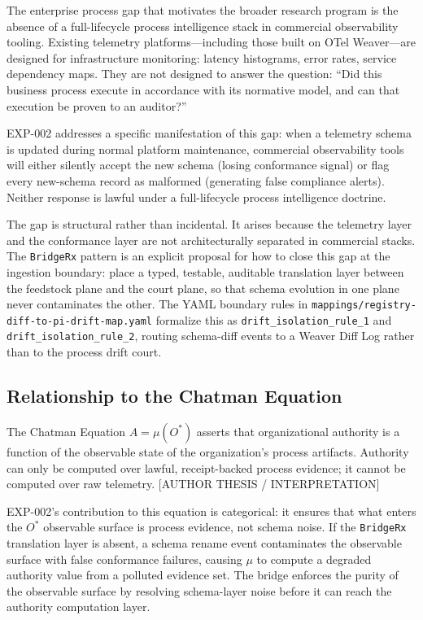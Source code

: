 The enterprise process gap that motivates the broader research program is the absence
of a full-lifecycle process intelligence stack in commercial observability tooling.
Existing telemetry platforms---including those built on OTel Weaver---are designed for
infrastructure monitoring: latency histograms, error rates, service dependency maps.
They are not designed to answer the question: ``Did this business process execute
in accordance with its normative model, and can that execution be proven to an
auditor?''

EXP-002 addresses a specific manifestation of this gap: when a telemetry schema is
updated during normal platform maintenance, commercial observability tools will either
silently accept the new schema (losing conformance signal) or flag every new-schema
record as malformed (generating false compliance alerts). Neither response is lawful
under a full-lifecycle process intelligence doctrine.

The gap is structural rather than incidental. It arises because the telemetry layer
and the conformance layer are not architecturally separated in commercial stacks. The
\texttt{BridgeRx} pattern is an explicit proposal for how to close this gap at the
ingestion boundary: place a typed, testable, auditable translation layer between the
feedstock plane and the court plane, so that schema evolution in one plane never
contaminates the other. The YAML boundary rules in
\texttt{mappings/registry-diff-to-pi-drift-map.yaml} formalize this as
\texttt{drift\_isolation\_rule\_1} and \texttt{drift\_isolation\_rule\_2}, routing
schema-diff events to a Weaver Diff Log rather than to the process drift court.

\subsection{Relationship to the Chatman Equation}
\label{sec:otel-weaver-exp-002-diff-to-residual-lineage-chatman-equation}

The Chatman Equation $A = \mu(O^*)$ asserts that organizational authority is a
function of the observable state of the organization's process artifacts. Authority
can only be computed over lawful, receipt-backed process evidence; it cannot be
computed over raw telemetry. \textsc{[AUTHOR THESIS / INTERPRETATION]}

EXP-002's contribution to this equation is categorical: it ensures that what enters
the $O^*$ observable surface is process evidence, not schema noise. If the
\texttt{BridgeRx} translation layer is absent, a schema rename event contaminates
the observable surface with false conformance failures, causing $\mu$ to compute
a degraded authority value from a polluted evidence set. The bridge enforces the
purity of the observable surface by resolving schema-layer noise before it can
reach the authority computation layer.

